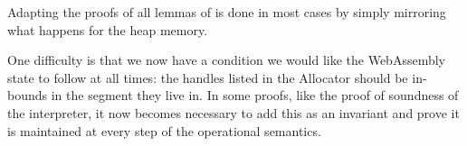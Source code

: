 \documentclass[a4paper]{article}
\begin{document}
Adapting the proofs of all lemmas of \iriswasm is done in most cases by simply mirroring what happens for the heap memory.

One difficulty is that we now have a condition we would like the WebAssembly state to follow at all times: the handles listed in the Allocator should be in-bounds in the segment they live in. In some proofs, like the proof of soundness of the interpreter, it now becomes necessary to add this as an invariant and prove it is maintained at every step of the operational semantics.



\end{document}
